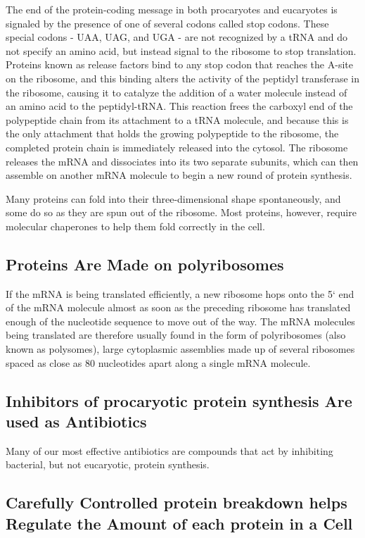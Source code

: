 The end of the protein-coding message in both procaryotes and eucaryotes
is signaled by the presence of one of several codons called stop codons.
These special codons - UAA, UAG, and UGA - are not
recognized by a tRNA and do not specify an amino acid, but instead signal
to the ribosome to stop translation. Proteins known as release factors bind
to any stop codon that reaches the A-site on the ribosome, and this binding
alters the activity of the peptidyl transferase in the ribosome, causing
it to catalyze the addition of a water molecule instead of an amino acid
to the peptidyl-tRNA. This reaction frees the carboxyl end
of the polypeptide chain from its attachment to a tRNA molecule, and
because this is the only attachment that holds the growing polypeptide to
the ribosome, the completed protein chain is immediately released into
the cytosol. The ribosome releases the mRNA and dissociates into its two
separate subunits, which can then assemble on another mRNA molecule
to begin a new round of protein synthesis.

Many proteins can fold into their three-dimensional shape spontaneously,
and some do so as they are spun out of the
ribosome. Most proteins, however, require molecular chaperones to help
them fold correctly in the cell.

\subsection{Proteins Are Made on polyribosomes}

If the mRNA is being translated efficiently, a new ribosome hops onto the 5`
end of the mRNA molecule almost as soon as the preceding ribosome has
translated enough of the nucleotide sequence to move out of the way.
The mRNA molecules being translated are therefore usually found in
the form of polyribosomes (also known as polysomes), large cytoplasmic
assemblies made up of several ribosomes spaced as close as 80 nucleotides
apart along a single mRNA molecule.

\subsection{Inhibitors of procaryotic protein synthesis Are used as Antibiotics}

Many of our most effective antibiotics are compounds that act by inhibiting
bacterial, but not eucaryotic, protein synthesis.

\subsection{Carefully Controlled protein breakdown helps Regulate the Amount of each protein in a Cell}

